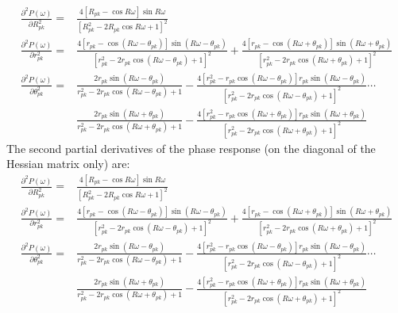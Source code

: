 \documentclass[a4paper,twoside,10pt,english]{report}
\begin{document}
\begin{align*}
  \frac{\partial^{2} P\left(\omega\right)}{\partial R_{pk}^{2}} =&
  \frac{4\left[R_{pk}-\cos R\omega\right]\sin R\omega}
         {\left[R_{pk}^{2}-2R_{pk}\cos R\omega+1\right]^{2}}\\
  \frac{\partial^{2} P\left(\omega\right)}{\partial r_{pk}^{2}} =&
  \frac{4\left[r_{pk}-\cos\left(R\omega-\theta_{pk}\right)\right]
        \sin\left(R\omega-\theta_{pk}\right)}
       {\left[r_{pk}^{2}-2r_{pk}\cos\left(R\omega-\theta_{pk}\right) +1\right]^{2}}
 +\frac{4\left[r_{pk}-\cos\left(R\omega+\theta_{pk}\right)\right]
        \sin\left(R\omega+\theta_{pk}\right)}
       {\left[r_{pk}^{2}-2r_{pk}\cos\left(R\omega+\theta_{pk}\right)+1\right]^{2}}\\
  \frac{\partial^{2} P\left(\omega\right)}{\partial \theta_{pk}^{2}} =&
\frac{2r_{pk}\sin\left(R\omega-\theta_{pk}\right)}
     {r_{pk}^{2}-2r_{pk}\cos\left(R\omega-\theta_{pk}\right)+1} 
-\frac{4\left[r_{pk}^{2}-r_{pk}\cos\left(R\omega-\theta_{pk}\right)\right]
       r_{pk}\sin\left(R\omega-\theta_{pk}\right)}
 {\left[r_{pk}^{2}-2r_{pk}\cos\left(R\omega-\theta_{pk}\right)+1\right]^{2}}\cdots\\
&\frac{2r_{pk}\sin\left(R\omega+\theta_{pk}\right)}
      {r_{pk}^{2}-2r_{pk}\cos\left(R\omega+\theta_{pk}\right)+1} 
-\frac{4\left[r_{pk}^{2}-r_{pk}\cos\left(R\omega+\theta_{pk}\right)\right]
       r_{pk}\sin\left(R\omega+\theta_{pk}\right)}
      {\left[r_{pk}^{2}-2r_{pk}\cos\left(R\omega+\theta_{pk}\right)+1\right]^{2}}
\end{align*}
The second partial derivatives of the phase response (on the diagonal of the
Hessian matrix only) are:
\begin{align*}
  \frac{\partial^{2} P\left(\omega\right)}{\partial R_{pk}^{2}} =&
  \frac{4\left[R_{pk}-\cos R\omega\right]\sin R\omega}
         {\left[R_{pk}^{2}-2R_{pk}\cos R\omega+1\right]^{2}}\\
  \frac{\partial^{2} P\left(\omega\right)}{\partial r_{pk}^{2}} =&
  \frac{4\left[r_{pk}-\cos\left(R\omega-\theta_{pk}\right)\right]
        \sin\left(R\omega-\theta_{pk}\right)}
       {\left[r_{pk}^{2}-2r_{pk}\cos\left(R\omega-\theta_{pk}\right) +1\right]^{2}}
 +\frac{4\left[r_{pk}-\cos\left(R\omega+\theta_{pk}\right)\right]
        \sin\left(R\omega+\theta_{pk}\right)}
       {\left[r_{pk}^{2}-2r_{pk}\cos\left(R\omega+\theta_{pk}\right)+1\right]^{2}}\\
  \frac{\partial^{2} P\left(\omega\right)}{\partial \theta_{pk}^{2}} =&
\frac{2r_{pk}\sin\left(R\omega-\theta_{pk}\right)}
     {r_{pk}^{2}-2r_{pk}\cos\left(R\omega-\theta_{pk}\right)+1} 
-\frac{4\left[r_{pk}^{2}-r_{pk}\cos\left(R\omega-\theta_{pk}\right)\right]
       r_{pk}\sin\left(R\omega-\theta_{pk}\right)}
 {\left[r_{pk}^{2}-2r_{pk}\cos\left(R\omega-\theta_{pk}\right)+1\right]^{2}}\cdots\\
&\frac{2r_{pk}\sin\left(R\omega+\theta_{pk}\right)}
      {r_{pk}^{2}-2r_{pk}\cos\left(R\omega+\theta_{pk}\right)+1} 
-\frac{4\left[r_{pk}^{2}-r_{pk}\cos\left(R\omega+\theta_{pk}\right)\right]
       r_{pk}\sin\left(R\omega+\theta_{pk}\right)}
      {\left[r_{pk}^{2}-2r_{pk}\cos\left(R\omega+\theta_{pk}\right)+1\right]^{2}}
\end{align*}
\end{document}
